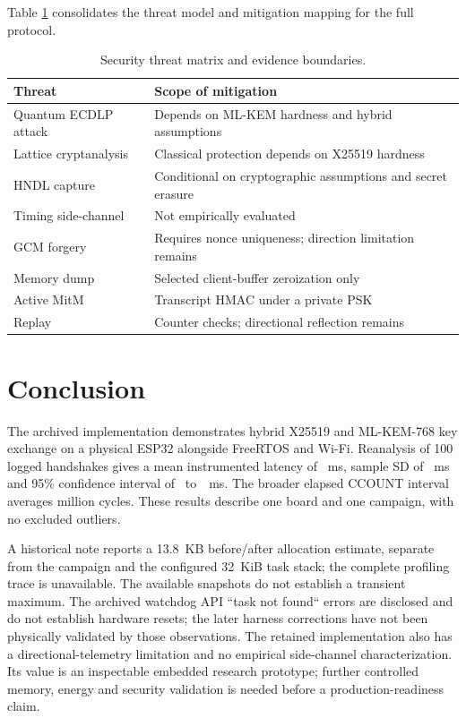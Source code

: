 \documentclass[journal, 10pt]{IEEEtran}
\begin{document}
Table \ref{tab:threats} consolidates the threat model and mitigation mapping for the full protocol.

\begin{table}[htbp]
\caption{Security threat matrix and evidence boundaries.}
\centering\small
\begin{tabularx}{\columnwidth}{lX}
\toprule
Threat & Scope of mitigation\\
\midrule
Quantum ECDLP attack & Depends on ML-KEM hardness and hybrid assumptions\\
Lattice cryptanalysis & Classical protection depends on X25519 hardness\\
HNDL capture & Conditional on cryptographic assumptions and secret erasure\\
Timing side-channel & Not empirically evaluated\\
GCM forgery & Requires nonce uniqueness; direction limitation remains\\
Memory dump & Selected client-buffer zeroization only\\
Active MitM & Transcript HMAC under a private PSK\\
Replay & Counter checks; directional reflection remains\\
\bottomrule
\end{tabularx}
\label{tab:threats}
\end{table}

\section{Conclusion}
The archived implementation demonstrates hybrid X25519 and ML-KEM-768 key exchange on a physical ESP32 alongside FreeRTOS and Wi-Fi. Reanalysis of 100 logged handshakes gives a mean instrumented latency of \BenchmarkMeanMs~ms, sample SD of \BenchmarkSdMs~ms and 95\% confidence interval of \BenchmarkLowMs~to~\BenchmarkHighMs~ms. The broader elapsed CCOUNT interval averages \BenchmarkCyclesM{} million cycles. These results describe one board and one campaign, with no excluded outliers.

A historical note reports a 13.8~KB before/after allocation estimate, separate from the campaign and the configured 32~KiB task stack; the complete profiling trace is unavailable. The available snapshots do not establish a transient maximum. The archived watchdog API ``task not found`` errors are disclosed and do not establish hardware resets; the later harness corrections have not been physically validated by those observations. The retained implementation also has a directional-telemetry limitation and no empirical side-channel characterization. Its value is an inspectable embedded research prototype; further controlled memory, energy and security validation is needed before a production-readiness claim.
\end{document}

